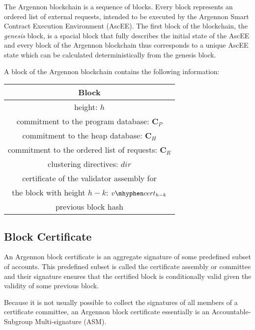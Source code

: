 
The Argennon blockchain is a sequence of blocks. Every block represents an ordered list of external requests, intended
to be executed by the Argennon Smart Contract Execution Environment (AscEE). The first block of the blockchain, the
\emph{genesis} block, is a spacial block that fully describes the initial state of the AscEE and every block of the
Argennon blockchain thus corresponds to a unique AscEE state which can be calculated deterministically from the genesis
block.

A block of the Argennon blockchain contains the following information:

\begin{center}
    \begin{tabular}{||c||}
        \hline
        \textbf{Block} \\ [0.6ex]
        \hline\hline
        height: $h$                          \\ [1.2ex]
        commitment to the program database: $\mathbf{C}_{P}$             \\ [1.2ex]
        commitment to the heap database: $\mathbf{C}_{H}$               \\ [1.2ex]
        commitment to the ordered list of requests: $\mathbf{C}_{R}$        \\ [1.2ex]
        clustering directives: $dir$                        \\ [1.2ex]
        certificate of the validator assembly for \\
        the block with height $h - k$: $v \mhyphen cert_{h-k}$         \\ [1.2ex]
        previous block hash                           \\ [1.2ex]
        \hline
    \end{tabular}
\end{center}

\subsection{Block Certificate}\label{subsec:block-certificate}

An Argennon block certificate is an aggregate signature of some predefined subset of accounts. This predefined subset
is called the certificate assembly or committee and their signature ensures that the certified block is conditionally
valid given the validity of some previous block.

Because it is not usually possible to collect the signatures of all members of a certificate committee, an Argennon
block certificate essentially is an Accountable-Subgroup Multi-signature (ASM).

